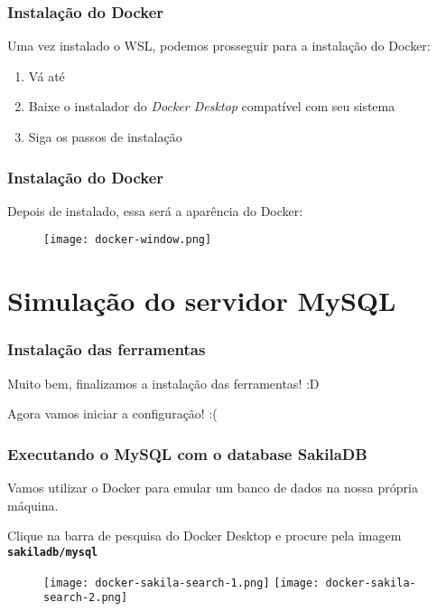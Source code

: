 \documentclass[t, 10pt, aspectratio=169, table, x11names]{beamer}
\begin{document}
	\begin{frame}
		\frametitle{Instalação do Docker}
		Uma vez instalado o WSL, podemos prosseguir para a instalação do Docker:
		\begin{enumerate}
			\item Vá até \href{https://www.docker.com/products/docker-desktop/}{}
			\item Baixe o instalador do \textit{Docker Desktop} compatível com seu sistema
			\item Siga os passos de instalação
		\end{enumerate}
		\begin{figure}[h]
			\hspace{0.5cm}
		\end{figure}
	\end{frame}
	
	\begin{frame}
		\frametitle{Instalação do Docker}
		Depois de instalado, essa será a aparência do Docker:
		\begin{figure}[h]
			\texttt{[image: docker-window.png]}
		\end{figure}
	\end{frame}
	
	\section{Simulação do servidor MySQL}

	\begin{frame}
		\frametitle{Instalação das ferramentas}
		\vspace{0.5cm}
		\begin{center}
			\Large
			Muito bem, finalizamos a instalação das ferramentas! :D
		\end{center}
		\vspace{1cm}
		\begin{center}
			\LARGE
			Agora vamos iniciar a configuração! :(
		\end{center}
	\end{frame}
	
	\begin{frame}[t]
		\frametitle{Executando o MySQL com o database SakilaDB}
		Vamos utilizar o Docker para emular um banco de dados na nossa própria máquina.
		
		Clique na barra de pesquisa do Docker Desktop e procure pela imagem \textbf{\texttt{sakiladb/mysql}}
		\vspace{0.3cm}
		\begin{figure}[h]
			\texttt{[image: docker-sakila-search-1.png]}
			\hspace{0.5cm}
			\texttt{[image: docker-sakila-search-2.png]}
		\end{figure}
	\end{frame}
	
\end{document}

